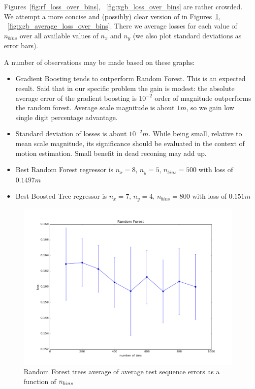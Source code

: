 \documentclass[twoside]{article}
\begin{document}
Figures~\ref{fig:rf_loss_over_bins}, ~\ref{fig:xgb_loss_over_bins} are
rather crowded. We attempt a more concise and (possibly) clear version
of in Figures~\ref{fig:rf_average_loss_over_bins},
~\ref{fig:xgb_average_loss_over_bins}.  There we average losses for
each value of $n_{bins}$ over all available values of $n_x$ and $n_y$
(we also plot standard deviations as error bars).

A number of observations may be made based on these graphs:
\begin{itemize}
\item Gradient Boosting tends to outperform Random Forest.  This is an
  expected result.  Said that in our specific problem the gain is
  modest: the absolute average error of the gradient boosting is
  $10^{-2}$ order of magnitude outperforms the random forest.  Average
  scale magnitude is about $1m$, so we gain low single digit
  percentage advantage.
\item Standard deviation of losses is about $10^{-2}m$.  While being
  small, relative to mean scale magnitude, its significance should be
  evaluated in the context of motion estimation.  Small benefit in
  dead reconing may add up.
\item Best Random Forest regressor is $n_x=8$, $n_y=5$, $n_{bins}=500$ with loss of $0.1497 m$
\item Best Boosted Tree regressor is $n_x=7$, $n_y=4$, $n_{bins}=800$ with loss of $0.151 m$  
  
\end{itemize}

\begin{figure}[!ht]
  \centering  
  \includegraphics[width=0.6\linewidth]{rf_average_loss_over_bins}
  \caption{Random Forest trees average of average test sequence errors as a
    function of $\protect n_{bins}$}
  \label{fig:rf_average_loss_over_bins}
\end{figure}
\end{document}
